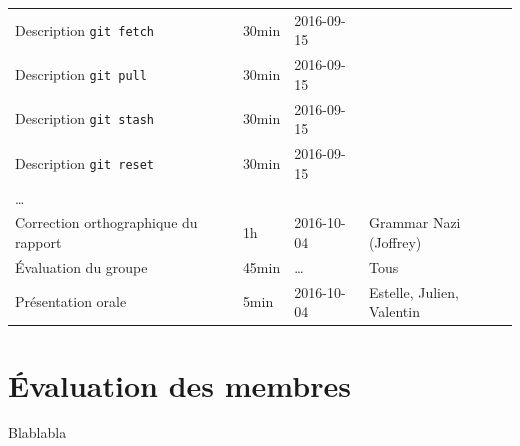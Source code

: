 \documentclass[11pt,canadien]{article}
\begin{document}
\begin{appendices}
\begin{tabular}{l l l l}
	\\ Description \texttt{git fetch}       & 30min & 2016-09-15 & \kevin
	\\ Description \texttt{git pull}        & 30min & 2016-09-15 & \kevin
	\\ Description \texttt{git stash}       & 30min & 2016-09-15 & \antoine
	\\ Description \texttt{git reset}       & 30min & 2016-09-15 & \antoine
	\\ \ldots
	\\ Correction orthographique du rapport & 1h    & 2016-10-04 & Grammar Nazi (Joffrey)
	\\ Évaluation du groupe                 & 45min & \ldots     & Tous
	\\ Présentation orale                   & 5min  & 2016-10-04 & Estelle, Julien, Valentin
\end{tabular}

\section{Évaluation des membres}
Blablabla

\end{appendices}
\end{document}
